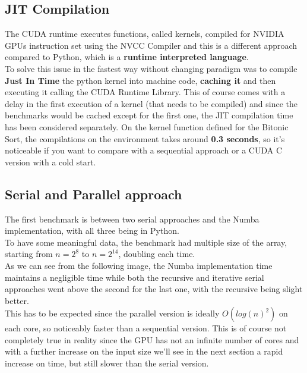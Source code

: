 \documentclass[a4paper, 12pt, oneside]{article}
\begin{document}
\subsection{JIT Compilation}
The CUDA runtime executes functions, called kernels, compiled for NVIDIA GPUs instruction set using the NVCC Compiler \cite{nvcc} and this is a different approach compared to Python, which is a \textbf{runtime interpreted language}.\\
To solve this issue in the fastest way without changing paradigm was to compile \textbf{Just In Time} the python kernel into machine code, \textbf{caching it} and then executing it calling the CUDA Runtime Library.
This of course comes with a delay in the first execution of a kernel (that needs to be compiled) and since the benchmarks would be cached except for the first one, the JIT compilation time has been considered separately.
On the kernel function defined for the Bitonic Sort, the compilations on the environment takes around \textbf{0.3 seconds}, so it's noticeable if you want to compare with a sequential approach or a CUDA C version with a cold start.

\subsection{Serial and Parallel approach}

The first benchmark is between two serial approaches and the Numba implementation, with all three being in Python.\\
To have some meaningful data, the benchmark had multiple size of the array, starting from $n=2^8$ to $n=2^14$, doubling each time.\\
As we can see from the following image, the Numba implementation time maintains a negligible time while both the recursive and iterative serial approaches went above the second for the last one, with the recursive being slight better.\\
This has to be expected since the parallel version is ideally $O(log(n)^2)$ on each core, so noticeably faster than a sequential version. This is of course not completely true in reality since the GPU has not an infinite number of cores and with a further increase on the input size we'll see in the next section a rapid increase on time, but still slower than the serial version.
\end{document}
